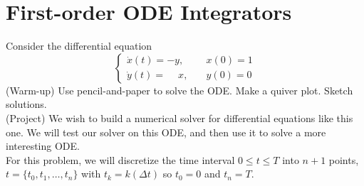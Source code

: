 
\section{First-order ODE Integrators}
Consider the differential equation
\begin{equation}
\label{eq:ode_system}
\begin{cases} \dot{x}(t) = -y, & \quad x(0) = 1\\ \dot{y}(t) = \phantom{-}x, & \quad y(0) = 0 \end{cases}
\end{equation}
(Warm-up) Use pencil-and-paper to solve the ODE. Make a quiver plot. Sketch solutions.\\
(Project) We wish to build a numerical solver for differential equations like this one. We will test our solver on this ODE, and then use it to solve a more interesting ODE.\\
For this problem, we will discretize the time interval $0 \leq t \leq T$ into $n+1$ points, $ t = \{t_0, t_1, \dots, t_n\}$ with $t_k = k (\Delta t)$ so $t_0=0$ and $t_n = T$. 
